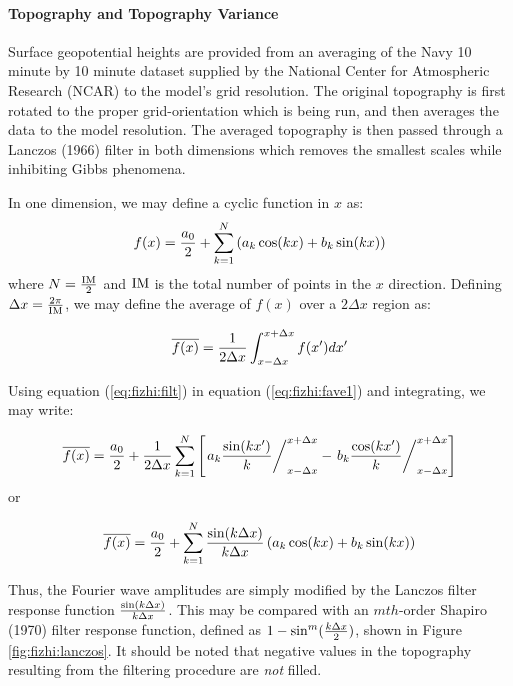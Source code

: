 \paragraph{Topography and Topography Variance}

Surface geopotential heights are provided from an averaging of the Navy 10 minute
by 10 minute dataset supplied by the National Center for Atmospheric Research (NCAR) to the
model's grid resolution. The original topography is first rotated to the proper grid-orientation
which is being run, and then  
averages the data to the model resolution.  
The averaged topography is then passed through a Lanczos (1966) filter in both dimensions 
which removes the smallest
scales while inhibiting Gibbs phenomena.  

In one dimension, we may define a cyclic function in $x$ as:
\begin{equation}
f(x) = {a_0 \over 2} + \sum_{k=1}^N \left( a_k \cos(kx) + b_k \sin(kx) \right)
\label{eq:fizhi:filt}
\end{equation}
where $N = { {\rm IM} \over 2 }$ and ${\rm IM}$ is the total number of points in the $x$ direction.
Defining $\Delta x = { 2 \pi \over {\rm IM}}$, we may define the average of $f(x)$ over a 
$2 \Delta x$ region as:

\begin{equation}
\overline {f(x)} = {1 \over {2 \Delta x}} \int_{x-\Delta x}^{x+\Delta x} f(x^{\prime}) dx^{\prime}
\label{eq:fizhi:fave1}
\end{equation}

Using equation (\ref{eq:fizhi:filt}) in equation (\ref{eq:fizhi:fave1}) and integrating, we may write:
 
\begin{equation}
\overline {f(x)} = {a_0 \over 2} + {1 \over {2 \Delta x}}
\sum_{k=1}^N \left [
\left. a_k { \sin(kx^{\prime}) \over k } \right /_{x-\Delta x}^{x+\Delta x} -
\left. b_k { \cos(kx^{\prime}) \over k } \right /_{x-\Delta x}^{x+\Delta x} 
\right]
\end{equation}
or

\begin{equation}
\overline {f(x)} = {a_0 \over 2} + \sum_{k=1}^N {\sin(k \Delta x) \over {k \Delta x}}
\left( a_k \cos(kx) + b_k \sin(kx) \right)
\label{eq:fizhi:fave2}
\end{equation}

Thus, the Fourier wave amplitudes are simply modified by the Lanczos filter response
function ${\sin(k\Delta x) \over {k \Delta x}}$.  This may be compared with an $mth$-order 
Shapiro (1970) filter response function, defined as $1-\sin^m({k \Delta x \over 2})$,
shown in Figure \ref{fig:fizhi:lanczos}.
It should be noted that negative values in the topography resulting from
the filtering procedure are {\em not} filled.


